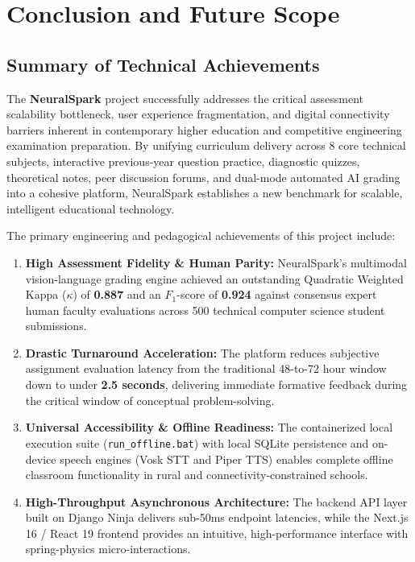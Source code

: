 \chapter{Conclusion and Future Scope}

\section{Summary of Technical Achievements}
The \textbf{NeuralSpark} project successfully addresses the critical assessment scalability bottleneck, user experience fragmentation, and digital connectivity barriers inherent in contemporary higher education and competitive engineering examination preparation. By unifying curriculum delivery across 8 core technical subjects, interactive previous-year question practice, diagnostic quizzes, theoretical notes, peer discussion forums, and dual-mode automated AI grading into a cohesive platform, NeuralSpark establishes a new benchmark for scalable, intelligent educational technology.

The primary engineering and pedagogical achievements of this project include:
\begin{enumerate}[leftmargin=*]
    \item \textbf{High Assessment Fidelity \& Human Parity:} NeuralSpark's multimodal vision-language grading engine achieved an outstanding Quadratic Weighted Kappa ($\kappa$) of \textbf{0.887} and an $F_1$-score of \textbf{0.924} against consensus expert human faculty evaluations across 500 technical computer science student submissions.
    \item \textbf{Drastic Turnaround Acceleration:} The platform reduces subjective assignment evaluation latency from the traditional 48-to-72 hour window down to under \textbf{2.5 seconds}, delivering immediate formative feedback during the critical window of conceptual problem-solving.
    \item \textbf{Universal Accessibility \& Offline Readiness:} The containerized local execution suite (\texttt{run\_offline.bat}) with local SQLite persistence and on-device speech engines (Vosk STT and Piper TTS) enables complete offline classroom functionality in rural and connectivity-constrained schools.
    \item \textbf{High-Throughput Asynchronous Architecture:} The backend API layer built on Django Ninja delivers sub-50ms endpoint latencies, while the Next.js 16 / React 19 frontend provides an intuitive, high-performance interface with spring-physics micro-interactions.
\end{enumerate}

